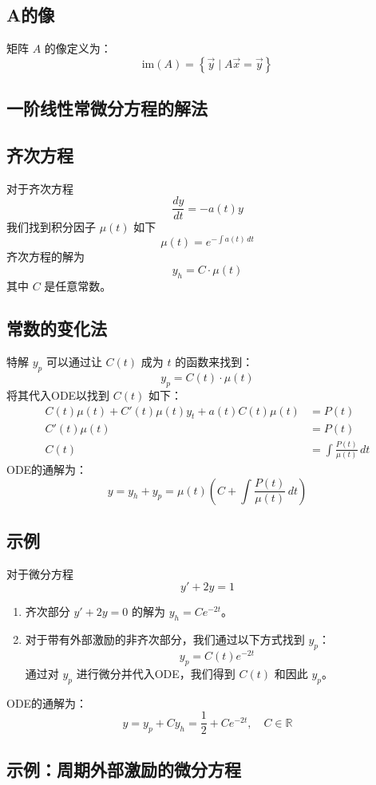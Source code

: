 \documentclass{ctexart}
\begin{document}
\subsection*{A的像}
矩阵 \( A \) 的像定义为：
\[ \text{im}(A) = \left\{ \vec{y} \mid A\vec{x} = \vec{y} \right\} \]


\subsection*{一阶线性常微分方程的解法}

\subsection*{齐次方程}
对于齐次方程
\[ \frac{dy}{dt} = -a(t)y \]
我们找到积分因子 \( \mu(t) \) 如下
\[ \mu(t) = e^{-\int a(t) \, dt} \]
齐次方程的解为
\[ y_h = C \cdot \mu(t) \]
其中 \( C \) 是任意常数。

\subsection*{常数的变化法}
特解 \( y_p \) 可以通过让 \( C(t) \) 成为 \( t \) 的函数来找到：
\[ y_p = C(t) \cdot \mu(t) \]
将其代入ODE以找到 \( C(t) \) 如下：
\begin{align*}
C(t) \mu(t) + C'(t) \mu(t) y_t + a(t) C(t) \mu(t) &= P(t) \\
C'(t) \mu(t) &= P(t) \\
C(t) &= \int \frac{P(t)}{\mu(t)} \, dt
\end{align*}
ODE的通解为：
\[ y = y_h + y_p = \mu(t) \left( C + \int \frac{P(t)}{\mu(t)} \, dt \right) \]

\subsection*{示例}
对于微分方程
\[ y' + 2y = 1 \]
\begin{enumerate}
    \item 齐次部分 \( y' + 2y = 0 \) 的解为 \( y_h = C e^{-2t} \)。
    \item 对于带有外部激励的非齐次部分，我们通过以下方式找到 \( y_p \)：
    \[ y_p = C(t) e^{-2t} \]
    通过对 \( y_p \) 进行微分并代入ODE，我们得到 \( C(t) \) 和因此 \( y_p \)。
\end{enumerate}
ODE的通解为：
\[ y = y_p + C y_h = \frac{1}{2} + C e^{-2t}, \quad C \in \mathbb{R} \]

\subsection*{示例：周期外部激励的微分方程}
\end{document}
